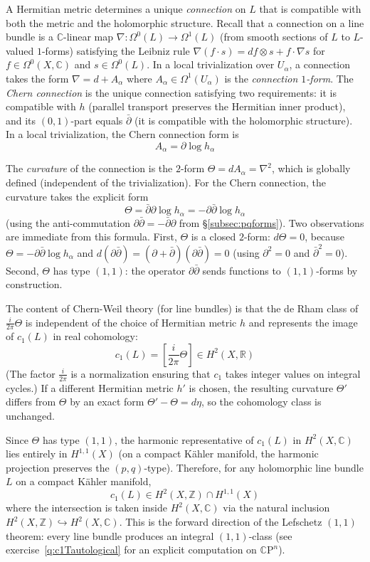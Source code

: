 \documentclass{article}
\newcommand{\C}{\mathbb{C}}
\newcommand{\R}{\mathbb{R}}
\newcommand{\Z}{{\mathbb{Z}}}
\newcommand{\CP}{\mathbb{C}\mathrm{P}}
\begin{document}
A Hermitian metric determines a unique \emph{connection} on $L$ that is
compatible with both the metric and the holomorphic structure. Recall that a
connection on a line bundle is a $\C$-linear map
$\nabla: \Omega^0(L) \to \Omega^1(L)$ (from smooth sections of $L$ to
$L$-valued $1$-forms) satisfying the Leibniz rule
$\nabla(f \cdot s) = df \otimes s + f \cdot \nabla s$ for $f \in
\Omega^0(X, \C)$ and $s \in \Omega^0(L)$. In a local trivialization over
$U_\alpha$, a connection takes the form $\nabla = d + A_\alpha$ where
$A_\alpha \in \Omega^1(U_\alpha)$ is the \emph{connection $1$-form}. The
\emph{Chern connection} is the unique connection satisfying two requirements:
it is compatible with $h$ (parallel transport preserves the Hermitian inner
product), and its $(0,1)$-part equals $\bar\partial$ (it is compatible with the
holomorphic structure). In a local trivialization, the Chern connection form is
\[
  A_\alpha = \partial \log h_\alpha
\]

The \emph{curvature} of the connection is the $2$-form
$\Theta = dA_\alpha = \nabla^2$, which is globally defined (independent of the
trivialization). For the Chern connection, the curvature takes the explicit
form
\[
  \Theta = \bar\partial\partial \log h_\alpha
    = -\partial\bar\partial \log h_\alpha
\]
(using the anti-commutation $\partial\bar\partial = -\bar\partial\partial$ from
\S\ref{subsec:pqforms}). Two observations are immediate from this formula.
First, $\Theta$ is a closed $2$-form: $d\Theta = 0$, because
$\Theta = -\partial\bar\partial \log h_\alpha$ and
$d(\partial\bar\partial) = (\partial + \bar\partial)(\partial\bar\partial) = 0$
(using $\partial^2 = 0$ and $\bar\partial^2 = 0$). Second, $\Theta$ has type
$(1,1)$: the operator $\partial\bar\partial$ sends functions to $(1,1)$-forms
by construction.

The content of Chern-Weil theory (for line bundles) is that the de Rham class
of $\frac{i}{2\pi}\Theta$ is independent of the choice of Hermitian metric $h$
and represents the image of $c_1(L)$ in real cohomology:
\[
  \boxed{c_1(L) = \left[\frac{i}{2\pi}\Theta\right] \in H^2(X, \R)}
\]
(The factor $\frac{i}{2\pi}$ is a normalization ensuring that $c_1$ takes
integer values on integral cycles.) If a different Hermitian metric $h'$ is
chosen, the resulting curvature $\Theta'$ differs from $\Theta$ by an exact
form $\Theta' - \Theta = d\eta$, so the cohomology class is unchanged.

Since $\Theta$ has type $(1,1)$, the harmonic representative of $c_1(L)$ in
$H^2(X, \C)$ lies entirely in $H^{1,1}(X)$ (on a compact K\"{a}hler manifold,
the harmonic projection preserves the $(p,q)$-type). Therefore, for any
holomorphic line bundle $L$ on a compact K\"{a}hler manifold,
\[
  c_1(L) \in H^2(X, \Z) \cap H^{1,1}(X)
\]
where the intersection is taken inside $H^2(X, \C)$ via the natural inclusion
$H^2(X, \Z) \hookrightarrow H^2(X, \C)$. This is the forward direction of the
Lefschetz $(1,1)$ theorem: every line bundle produces an integral $(1,1)$-class
(see exercise~\ref{q:c1Tautological} for an explicit computation on $\CP^n$).
\end{document}
